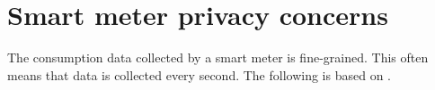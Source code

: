 \section{Smart meter privacy concerns}
The consumption data collected by a smart meter is fine-grained.
This often means that data is collected every second.
The following is based on \citet{privacy_memoir}.
